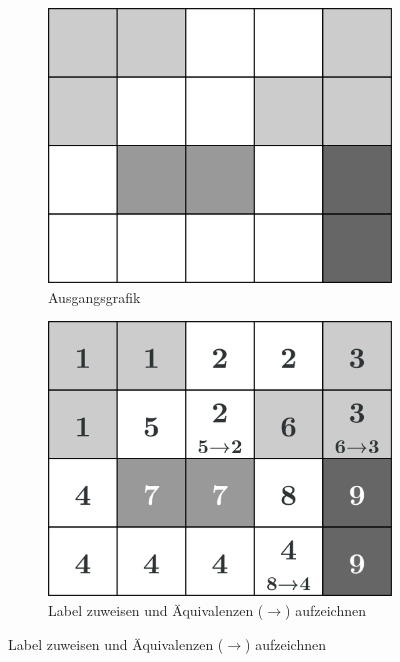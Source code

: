 \begin{figure}[H]
  \centering
  \begin{subfigure}[t]{0.327\columnwidth}
    \centering
    \includegraphics[width=\columnwidth]{img/basics/connected-compontents/labeling-1}
    \caption{Ausgangsgrafik}
  \end{subfigure}
  \begin{subfigure}[t]{0.327\columnwidth}
    \centering
    \includegraphics[width=\columnwidth]{img/basics/connected-compontents/labeling-2}
    \caption{Label zuweisen und Äquivalenzen ($\rightarrow$) aufzeichnen}
  \end{subfigure}

\end{figure}
